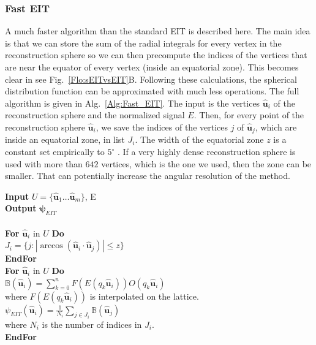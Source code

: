 \documentclass{bioinfo}
\begin{document}
\begin{methods}
\subsubsection{Fast EIT}

A much faster algorithm than the standard EIT is described here. The
main idea is that we can store the sum of the radial integrals for
every vertex in the reconstruction sphere so we can then precompute
the indices of the vertices that are near the equator of every vertex
(inside an equatorial zone). This becomes clear in see Fig.~\ref{Flo:sEITvsEIT}B.
Following these calculations, the spherical distribution function
can be approximated with much less operations. The full algorithm
is given in Alg.~\ref{Alg:Fast_EIT}. The input is the vertices $\hat{\bm{u}}_{i}$
of the reconstruction sphere and the normalized signal $E.$ Then,
for every point of the reconstruction sphere $\hat{\bm{u}}_{i}$,
we save the indices of the vertices $j$ of $\hat{\bm{u}}_{j}$, which
are inside an equatorial zone, in list $J_{i}$. The width of the
equatorial zone $z$ is a constant set empirically to $5^{\circ}$
. If a very highly dense reconstruction sphere is used with more than
$642$ vertices, which is the one we used, then the zone can be smaller.
That can potentially increase the angular resolution of the method.

%
\begin{algorithm}
\textbf{Input} $U=\{\hat{\bm{u}}_{1}\ldots\hat{\bm{u}}_{m}\}$, E\\
\textbf{Output} $\bm{\psi}_{EIT}$\\
\\
\textbf{For} $\hat{\bm{u}}_{i}$ in $U$ \textbf{Do}\\
\hspace*{2em} $J_{i}=\{j : |\arccos(\hat{\bm{u}}_{i}\cdot\hat{\bm{u}}_{j})|\leq z \}$\\
\textbf{EndFor} \\
\textbf{For} $\hat{\bm{u}}_{i}$ in $U$ \textbf{Do}\\
\hspace*{2em} $\mathbb{B}(\hat{\bm{u}}_{i})=\sum_{k=0}^{n}F(E(q_{k}\hat{\bm{u}}_{i}))O(q_{k}\hat{\bm{u}}_{i})$\\
\hspace*{4em} where $F(E(q_{k}\hat{\bm{u}}_{i}))$ is interpolated on the lattice.\\
\hspace*{2em} $\psi_{EIT}(\hat{\bm{u}}_{i})=\frac{1}{N_i}\sum_{j\in J_i}\mathbb{B}(\hat{\bm{u}}_{j})$\\ 
\hspace*{4em} where $N_i$ is the number of indices in $J_i$.\\
\textbf{EndFor}


\end{algorithm}
\end{methods}
\end{document}
